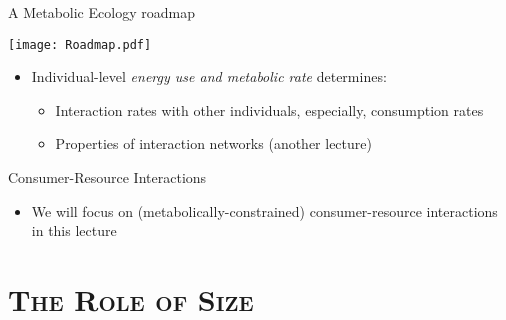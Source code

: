 \begin{frame}{A Metabolic Ecology roadmap}

  \begin{center}
    \texttt{[image: Roadmap.pdf]}
  \end{center}

  \vspace{6pt}
  \begin{itemize}[<+->]\setlength{\itemindent}{0em} \itemsep6pt
    \item Individual-level {\it energy use and metabolic rate\/} determines:
      \begin{itemize}\setlength{\itemindent}{0em} \itemsep6pt
        \item Interaction rates with other individuals, especially, consumption
        rates
        \item Properties of interaction networks (another lecture)
      \end{itemize}
  \end{itemize}
  
  \end{frame}
  
\begin{frame}{Consumer-Resource Interactions}

  \begin{center}
  \end{center}
  
  \begin{itemize}[<+->]\setlength{\itemindent}{0em}
    \item We will focus on (metabolically-constrained) consumer-resource interactions in this lecture  
  \end{itemize}
  

\end{frame}
  
\section{\scshape The Role of Size}

